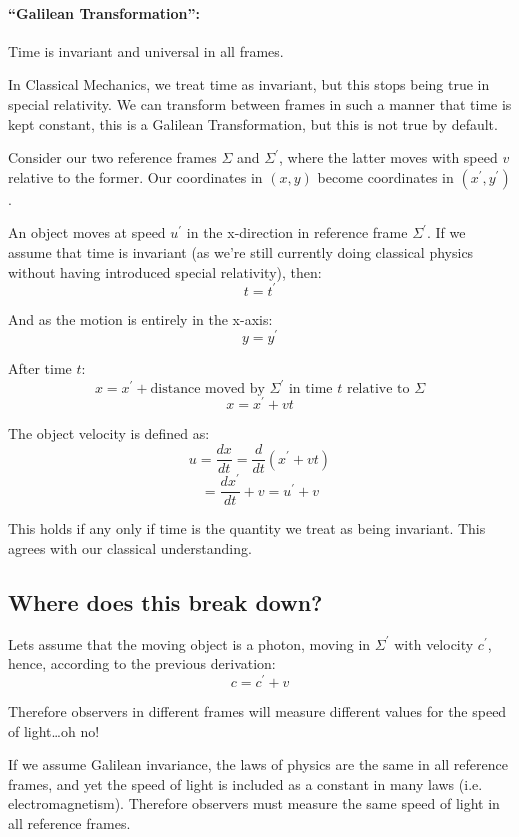 \paragraph{``Galilean Transformation'':} Time is invariant and universal in all frames.

In Classical Mechanics, we treat time as invariant, but this stops being true in special relativity. We can transform between frames in such a manner that time is kept constant, this is a Galilean Transformation, but this is not true by default.

Consider our two reference frames $\Sigma$ and $\Sigma^\prime$, where the latter moves with speed $v$ relative to the former. Our coordinates in $(x, y)$ become coordinates in $(x^\prime, y^\prime)$.

An object moves at speed $u^\prime$ in the x-direction in reference frame $\Sigma^\prime$. If we assume that time is invariant (as we're still currently doing classical physics without having introduced special relativity), then:
\[
    t = t^\prime
\]

And as the motion is entirely in the x-axis:
\[
    y = y^\prime
\]

After time $t$:
\[
    x = x^\prime + \text{distance moved by $\Sigma^\prime$ in time $t$ relative to $\Sigma$}
\]
\[
    x = x^\prime + vt
\]

The object velocity is defined as:
\[
    u = \frac{dx}{dt} = \frac{d}{dt} \left(x^\prime + vt\right)
\]
\[
    = \frac{dx^\prime}{dt} + v = u^\prime + v
\]

This holds if any only if time is the quantity we treat as being invariant. This agrees with our classical understanding.

\subsection{Where does this break down?}

Lets assume that the moving object is a photon, moving in $\Sigma^\prime$ with velocity $c^\prime$, hence, according to the previous derivation:
\[
    c = c^\prime + v
\]

Therefore observers in different frames will measure different values for the speed of light\dots oh no!

If we assume Galilean invariance, the laws of physics are the same in all reference frames, and yet the speed of light is included as a constant in many laws (i.e. electromagnetism). Therefore observers must measure the same speed of light in all reference frames.


